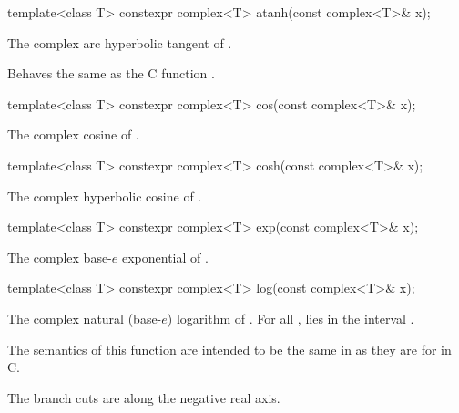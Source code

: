 %
%
\begin{itemdecl}
template<class T> constexpr complex<T> atanh(const complex<T>& x);
\end{itemdecl}

\begin{itemdescr}
\pnum
\returns
The complex arc hyperbolic tangent of .

\pnum
\remarks
Behaves the same as the C function .
\end{itemdescr}

%
\begin{itemdecl}
template<class T> constexpr complex<T> cos(const complex<T>& x);
\end{itemdecl}

\begin{itemdescr}
\pnum
\returns
The complex cosine of .
\end{itemdescr}

%
\begin{itemdecl}
template<class T> constexpr complex<T> cosh(const complex<T>& x);
\end{itemdecl}

\begin{itemdescr}
\pnum
\returns
The complex hyperbolic cosine of .
\end{itemdescr}

%
\begin{itemdecl}
template<class T> constexpr complex<T> exp(const complex<T>& x);
\end{itemdecl}

\begin{itemdescr}
\pnum
\returns
The complex base-$e$ exponential of .
\end{itemdescr}

%
\begin{itemdecl}
template<class T> constexpr complex<T> log(const complex<T>& x);
\end{itemdecl}

\begin{itemdescr}
\pnum
\returns
The complex natural (base-$e$) logarithm of . For all ,
 lies in the interval \crange{$-\pi$}{$\pi$}.
\begin{note}
The semantics of this function are intended to be the same in \Cpp{}
as they are for  in C.
\end{note}

\pnum
\remarks
The branch cuts are along the negative real axis.
\end{itemdescr}

